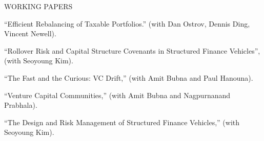 \documentclass{article}
\begin{document}




\begin{description}
\item[WORKING PAPERS] \mbox{}
\end{description}

\begin{etaremune}
\setlength\itemsep{-0.3em}


\item ``Efficient Rebalancing of Taxable Portfolios.'' (with Dan Ostrov, Dennis Ding, Vincent Newell). 

\item ``Rollover Risk and Capital Structure Covenants in Structured Finance Vehicles'', (with Seoyoung Kim).



\item ``The Fast and the Curious: VC Drift,'' (with Amit Bubna and Paul Hanouna). 


\item ``Venture Capital Communities,'' (with Amit Bubna and Nagpurnanand Prabhala). 

\item ``The Design and Risk Management of Structured Finance Vehicles,'' (with Seoyoung Kim).









\end{etaremune}
\end{document}
